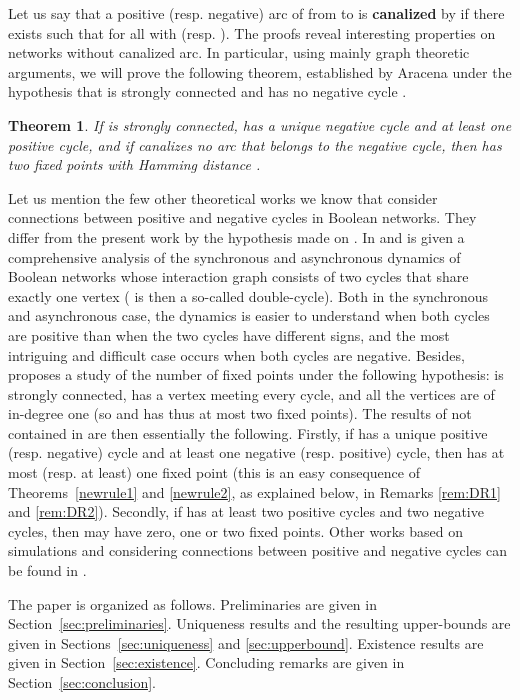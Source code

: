 \documentclass[11pt,a4paper]{article}
\newtheorem{theorem}{Theorem}
\begin{document}
\medskip
Let us say that a positive (resp. negative) arc of  from  to  is {\bf canalized} by  if there exists  such that  for all  with  (resp. ). The proofs reveal interesting properties on networks without canalized arc. In particular, using mainly graph theoretic arguments, we will prove the following theorem, established by Aracena under the hypothesis that  is strongly connected and has no negative cycle \cite[Theorem 6]{A08}. 

\begin{theorem}\label{strong}
If  is strongly connected, has a unique negative cycle and at least one positive cycle, and if  canalizes no arc that belongs to the negative cycle, then  has two fixed points with Hamming distance . 
\end{theorem}

Let us mention the few other theoretical works we know that consider connections between positive and negative cycles in Boolean networks. They differ from the present work by the hypothesis made on . In \cite{DNS12} and \cite{MNR14} is given a comprehensive analysis of the synchronous and asynchronous dynamics of Boolean networks whose interaction graph  consists of two cycles that share exactly one vertex ( is then a so-called double-cycle). Both in the synchronous and asynchronous case, the dynamics is easier to understand when both cycles are positive than when the two cycles have different signs, and the most intriguing and difficult case occurs when both cycles are negative. Besides, \cite{DR12} proposes a study of the number of fixed points under the following hypothesis:  is strongly connected, has a vertex  meeting every cycle, and all the vertices  are of in-degree one (so  and  has thus at most two fixed points). The results of \cite{DR12} not contained in \cite{A08} are then essentially the following. Firstly, if  has a unique positive (resp. negative) cycle and at least one negative (resp. positive) cycle, then  has at most (resp. at least) one fixed point (this is an easy consequence of Theorems~\ref{newrule1} and \ref{newrule2}, as explained below, in Remarks \ref{rem:DR1} and \ref{rem:DR2}). Secondly, if  has at least two positive cycles and two negative cycles, then  may have zero, one or two fixed points. Other works based on simulations and considering connections between positive and negative cycles can be found in \cite{KC07,SVL08}. 

 
\medskip 
The paper is organized as follows. Preliminaries are given in Section~\ref{sec:preliminaries}. Uniqueness results and the resulting upper-bounds are given in Sections~\ref{sec:uniqueness} and \ref{sec:upperbound}. Existence results are given in Section~\ref{sec:existence}. Concluding remarks are given in Section~\ref{sec:conclusion}. 
\end{document}
